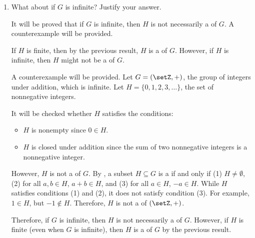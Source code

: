 \begin{enumerate}
\begin{enumerate}
\begin{subprove}
      Therefore, if \(G\) is finite, then \(H\) is a  of \(G\).
    \end{subprove}
    \item What about if \(G\) is infinite? Justify your answer.
    \begin{subprove}
      It will be proved that if \(G\) is infinite, then \(H\) is not necessarily a  of \(G\).
      A counterexample will be provided.
      
      If \(H\) is finite, then by the previous result, \(H\) is a  of \(G\).
      However, if \(H\) is infinite, then \(H\) might not be a  of \(G\).
      
      A counterexample will be provided.
      Let \(G = (\setZ, +)\), the group of integers under addition, which is infinite.
      Let \(H = \{0, 1, 2, 3, \ldots\}\), the set of nonnegative integers.
      
      It will be checked whether \(H\) satisfies the conditions:
      \begin{itemize}
        \item \(H\) is nonempty since \(0 \in H\).
        \item \(H\) is closed under addition since the sum of two nonnegative integers is a nonnegative integer.
      \end{itemize}
      
      However, \(H\) is not a  of \(G\).
      By , a subset \(H \subseteq G\) is a  if and only if (1) \(H \neq \emptyset\), (2) for all \(a, b \in H\), \(a + b \in H\), and (3) for all \(a \in H\), \(-a \in H\).
      While \(H\) satisfies conditions (1) and (2), it does not satisfy condition (3).
      For example, \(1 \in H\), but \(-1 \notin H\).
      Therefore, \(H\) is not a  of \((\setZ, +)\).
      
      Therefore, if \(G\) is infinite, then \(H\) is not necessarily a  of \(G\).
      However, if \(H\) is finite (even when \(G\) is infinite), then \(H\) is a  of \(G\) by the previous result.
    \end{subprove}
  \end{enumerate}
\end{enumerate}







